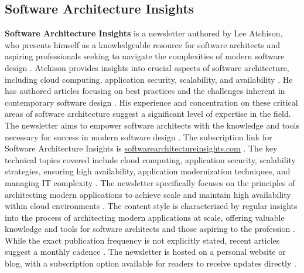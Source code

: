 \documentclass[11pt]{article}
\begin{document}
\subsection{Software Architecture Insights}
\textbf{Software Architecture Insights} is a newsletter authored by Lee Atchison, who presents himself as a knowledgeable resource for software architects and aspiring professionals seeking to navigate the complexities of modern software design \citep{atchison2025softwareinsights}. Atchison provides insights into crucial aspects of software architecture, including cloud computing, application security, scalability, and availability \citep{atchison2025softwareinsights}. He has authored articles focusing on best practices and the challenges inherent in contemporary software design \citep{atchison2025softwareinsights}. His experience and concentration on these critical areas of software architecture suggest a significant level of expertise in the field. The newsletter aims to empower software architects with the knowledge and tools necessary for success in modern software design \citep{atchison2025softwareinsights}. The subscription link for Software Architecture Insights is \url{softwarearchitectureinsights.com} \citep{atchison2025softwareinsights}. The key technical topics covered include cloud computing, application security, scalability strategies, ensuring high availability, application modernization techniques, and managing IT complexity \citep{atchison2025softwareinsights}. The newsletter specifically focuses on the principles of architecting modern applications to achieve scale and maintain high availability within cloud environments \citep{atchison2025softwareinsights}. The content style is characterized by regular insights into the process of architecting modern applications at scale, offering valuable knowledge and tools for software architects and those aspiring to the profession \citep{atchison2025softwareinsights}. While the exact publication frequency is not explicitly stated, recent articles suggest a monthly cadence \citep{atchison2025softwareinsights}. The newsletter is hosted on a personal website or blog, with a subscription option available for readers to receive updates directly \citep{atchison2025softwareinsights}.
\end{document}

